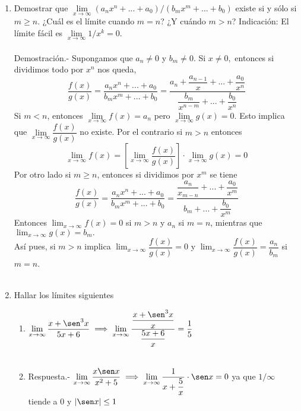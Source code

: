\begin{enumerate}
\item Demostrar que $\lim\limits_{x\to \infty} \left(a_nx^n + ... + a_0\right)/\left(b_mx^m + ... + b_0\right)$ existe si y sólo si $m\geq n.$ ¿Cuál es el límite cuando $m=n$? ¿Y cuándo $m>n$? Indicación: El límite fácil es $\lim\limits_{x\to \infty} 1/x^k = 0$.\\\\
    Demostración.-\; Supongamos que $a_n\neq 0$ y $b_m\neq 0$. Si $x\neq 0,$ entonces si dividimos todo por $x^n$ nos queda, $$\dfrac{f(x)}{g(x)} =\dfrac{a_nx^n + ... + a_0}{b_mx^m+...+b_0} = \dfrac{a_n+\dfrac{a_{n-1}}{x}+...+\dfrac{a_0}{x^n}}{\dfrac{b_m}{x^{n-m}}+...+ \dfrac{b_0}{x^n}}$$
    Si $m<n$, entonces $\lim\limits_{x\to \infty}f(x)=a_n$ pero $\lim\limits_{x\to \infty}g(x)=0.$ Esto implica que $\lim\limits_{x\to \infty} \dfrac{f(x)}{g(x)}$ no existe. Por el contrario si $m>n$ entonces $$\lim_{x\to \infty} f(x) = \left[\lim_{x\to \infty} \dfrac{f(x)}{g(x)}\right]\cdot \lim_{x\to \infty}g(x)=0$$
    Por otro lado si $m\geq n$, entonces si dividimos por $x^m$ se tiene $$\dfrac{f(x)}{g(x)} =\dfrac{a_nx^n + ... + a_0}{b_mx^m+...+b_0} = \dfrac{\dfrac{a_n}{x_{m-n}}+...+\dfrac{a_0}{x^m}}{b_m+...+\dfrac{b_0}{x^m}}$$
    Entonces $\lim_{x\to \infty}f(x)=0$ si $m>n$ y $a_n$ si $m=n$, mientras que $\lim_{x\to \infty}g(x)=b_m.$ \\
    Así pues, si $m>n$ implica $\lim_{x\to \infty} \dfrac{f(x)}{g(x)}=0$ y $\lim_{x\to \infty}\dfrac{f(x)}{g(x)}=\dfrac{a_n}{b_m}$ si $m=n$.\\\\

\item Hallar los límites siguientes
\begin{enumerate}[\bfseries (i)]

    \item $\lim\limits_{x\to \infty} \dfrac{x+\sen^3 x}{5x+6} \; \Longrightarrow \; \lim\limits_{x\to \infty} \dfrac{\dfrac{x+\sen^3 x}{x}}{\dfrac{5x+6}{x}} = \dfrac{1}{5}$\\\\

    \item 
	Respuesta.-\; $\lim\limits_{x\to \infty}\dfrac{x\sen x}{x^2+5} \; \Longrightarrow\; \lim\limits_{x\to \infty}\dfrac{1}{x+\dfrac{5}{x}}\cdot \sen x = 0$ \quad ya que $1/\infty$ tiende a $0$ y $|\sen x| \leq 1$\\\\


\end{enumerate}
\end{enumerate}
